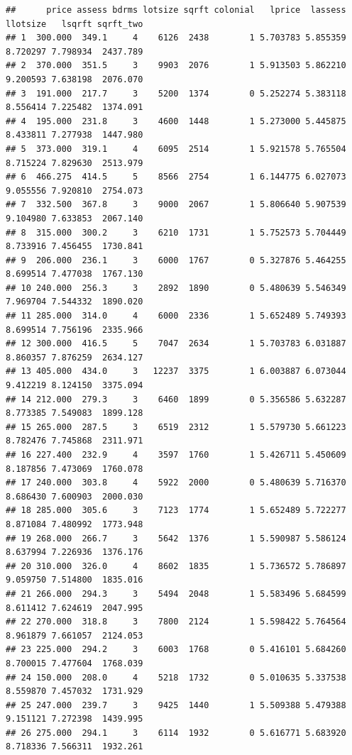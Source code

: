 \documentclass[
]{book}
\theoremstyle{definition}
\theoremstyle{definition}
\theoremstyle{definition}
\theoremstyle{definition}
\theoremstyle{remark}
\begin{document}
\begin{verbatim}
##      price assess bdrms lotsize sqrft colonial   lprice  lassess  llotsize   lsqrft sqrft_two
## 1  300.000  349.1     4    6126  2438        1 5.703783 5.855359  8.720297 7.798934  2437.789
## 2  370.000  351.5     3    9903  2076        1 5.913503 5.862210  9.200593 7.638198  2076.070
## 3  191.000  217.7     3    5200  1374        0 5.252274 5.383118  8.556414 7.225482  1374.091
## 4  195.000  231.8     3    4600  1448        1 5.273000 5.445875  8.433811 7.277938  1447.980
## 5  373.000  319.1     4    6095  2514        1 5.921578 5.765504  8.715224 7.829630  2513.979
## 6  466.275  414.5     5    8566  2754        1 6.144775 6.027073  9.055556 7.920810  2754.073
## 7  332.500  367.8     3    9000  2067        1 5.806640 5.907539  9.104980 7.633853  2067.140
## 8  315.000  300.2     3    6210  1731        1 5.752573 5.704449  8.733916 7.456455  1730.841
## 9  206.000  236.1     3    6000  1767        0 5.327876 5.464255  8.699514 7.477038  1767.130
## 10 240.000  256.3     3    2892  1890        0 5.480639 5.546349  7.969704 7.544332  1890.020
## 11 285.000  314.0     4    6000  2336        1 5.652489 5.749393  8.699514 7.756196  2335.966
## 12 300.000  416.5     5    7047  2634        1 5.703783 6.031887  8.860357 7.876259  2634.127
## 13 405.000  434.0     3   12237  3375        1 6.003887 6.073044  9.412219 8.124150  3375.094
## 14 212.000  279.3     3    6460  1899        0 5.356586 5.632287  8.773385 7.549083  1899.128
## 15 265.000  287.5     3    6519  2312        1 5.579730 5.661223  8.782476 7.745868  2311.971
## 16 227.400  232.9     4    3597  1760        1 5.426711 5.450609  8.187856 7.473069  1760.078
## 17 240.000  303.8     4    5922  2000        0 5.480639 5.716370  8.686430 7.600903  2000.030
## 18 285.000  305.6     3    7123  1774        1 5.652489 5.722277  8.871084 7.480992  1773.948
## 19 268.000  266.7     3    5642  1376        1 5.590987 5.586124  8.637994 7.226936  1376.176
## 20 310.000  326.0     4    8602  1835        1 5.736572 5.786897  9.059750 7.514800  1835.016
## 21 266.000  294.3     3    5494  2048        1 5.583496 5.684599  8.611412 7.624619  2047.995
## 22 270.000  318.8     3    7800  2124        1 5.598422 5.764564  8.961879 7.661057  2124.053
## 23 225.000  294.2     3    6003  1768        0 5.416101 5.684260  8.700015 7.477604  1768.039
## 24 150.000  208.0     4    5218  1732        0 5.010635 5.337538  8.559870 7.457032  1731.929
## 25 247.000  239.7     3    9425  1440        1 5.509388 5.479388  9.151121 7.272398  1439.995
## 26 275.000  294.1     3    6114  1932        0 5.616771 5.683920  8.718336 7.566311  1932.261

\end{verbatim}
\end{document}
